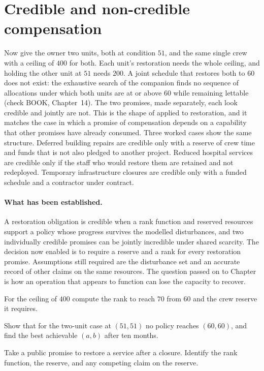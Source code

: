 \section{Credible and non-credible compensation}

Now give the owner two units, both at condition $51$, and the same single crew with a ceiling of $400$ for both. Each unit's restoration needs the whole ceiling, and holding the other unit at $51$ needs $200$. A joint schedule that restores both to $60$ does not exist: the exhaustive search of the companion finds no sequence of allocations under which both units are at or above $60$ while remaining lettable (check BOOK, Chapter~14). The two promises, made separately, each look credible and jointly are not. This is the shape of  applied to restoration, and it matches the case in which a promise of compensation depends on a capability that other promises have already consumed. Three worked cases show the same structure. Deferred building repairs are credible only with a reserve of crew time and funds that is not also pledged to another project. Reduced hospital services are credible only if the staff who would restore them are retained and not redeployed. Temporary infrastructure closures are credible only with a funded schedule and a contractor under contract.

\paragraph{What has been established.} A restoration obligation is credible when a rank function and reserved resources support a policy whose progress survives the modelled disturbances, and two individually credible promises can be jointly incredible under shared scarcity. The decision now enabled is to require a reserve and a rank for every restoration promise. Assumptions still required are the disturbance set and an accurate record of other claims on the same resources. The question passed on to Chapter~ is how an operation that appears to function can lose the capacity to recover.

\begin{exercise}
For the ceiling of $400$ compute the rank to reach $70$ from $60$ and the crew reserve it requires.
\end{exercise}
\begin{exercise}
Show that for the two-unit case at $(51,51)$ no policy reaches $(60,60)$, and find the best achievable $(a,b)$ after ten months.
\end{exercise}
\begin{exercise}
Take a public promise to restore a service after a closure. Identify the rank function, the reserve, and any competing claim on the reserve.
\end{exercise}

